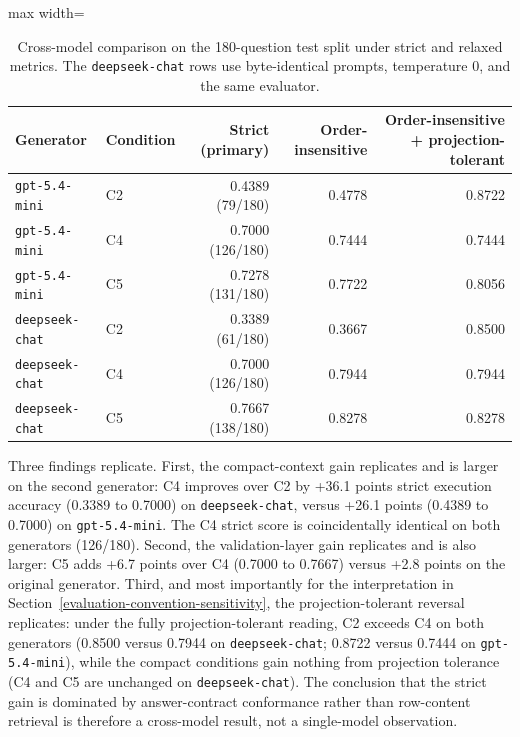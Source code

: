\documentclass[applsci,article,submit,moreauthors]{Definitions/mdpi}
\begin{document}
\begin{table}[H]
\small{\small}
\caption{Cross-model comparison on the 180-question test split under strict and relaxed metrics. The \texttt{deepseek-chat} rows use byte-identical prompts, temperature 0, and the same evaluator.}
\label{tab:second-model}
\centering
\begin{adjustbox}{max width=\textwidth}
\begin{tabular}{llrrr}
\toprule
\textbf{Generator} & \textbf{Condition} & \textbf{Strict (primary)} & \textbf{Order-insensitive} & \textbf{Order-insensitive + projection-tolerant} \\
\midrule
\texttt{gpt-5.4-mini} & C2 & 0.4389 (79/180) & 0.4778 & 0.8722 \\
\texttt{gpt-5.4-mini} & C4 & 0.7000 (126/180) & 0.7444 & 0.7444 \\
\texttt{gpt-5.4-mini} & C5 & 0.7278 (131/180) & 0.7722 & 0.8056 \\
\midrule
\texttt{deepseek-chat} & C2 & 0.3389 (61/180) & 0.3667 & 0.8500 \\
\texttt{deepseek-chat} & C4 & 0.7000 (126/180) & 0.7944 & 0.7944 \\
\texttt{deepseek-chat} & C5 & 0.7667 (138/180) & 0.8278 & 0.8278 \\
\bottomrule
\end{tabular}
\end{adjustbox}
\end{table}

Three findings replicate. First, the compact-context gain replicates and is larger on the second generator: C4 improves over C2 by +36.1 points strict execution accuracy (0.3389 to 0.7000) on \texttt{deepseek-chat}, versus +26.1 points (0.4389 to 0.7000) on \texttt{gpt-5.4-mini}. The C4 strict score is coincidentally identical on both generators (126/180). Second, the validation-layer gain replicates and is also larger: C5 adds +6.7 points over C4 (0.7000 to 0.7667) versus +2.8 points on the original generator. Third, and most importantly for the interpretation in Section~\ref{evaluation-convention-sensitivity}, the projection-tolerant reversal replicates: under the fully projection-tolerant reading, C2 exceeds C4 on both generators (0.8500 versus 0.7944 on \texttt{deepseek-chat}; 0.8722 versus 0.7444 on \texttt{gpt-5.4-mini}), while the compact conditions gain nothing from projection tolerance (C4 and C5 are unchanged on \texttt{deepseek-chat}). The conclusion that the strict gain is dominated by answer-contract conformance rather than row-content retrieval is therefore a cross-model result, not a single-model observation.
\end{document}
